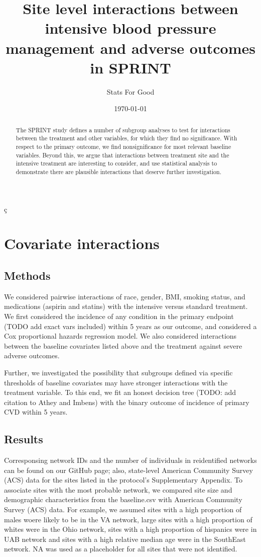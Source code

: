 ç\documentclass[10pt]{article}
\title{\vspace{-2em}Site level interactions between intensive blood pressure management and
  adverse outcomes in SPRINT}
\author{Stats For Good}
\date{\today}
\begin{document}
 \maketitle

\begin{abstract}
  The SPRINT study defines a number of subgroup analyses to test for
  interactions between the treatment and other variables, for which they find no
  significance. With respect to the primary outcome, we find nonsignificance
  for most relevant baseline variables. Beyond this, we argue that interactions
  between treatment site and the intensive treatment are interesting to
  consider, and use statistical analysis to demonstrate there are plausible
  interactions that deserve further investigation. 
\end{abstract}

\section{Covariate interactions}
\subsection{Methods}
We considered pairwise interactions of race, gender, BMI, smoking status, and
medications (aspirin and statins) with the intensive versus standard
treatment. We first considered the incidence of any condition in the
primary endpoint (TODO add exact vars included) within 5 years as our outcome,
and considered a Cox proportional hazards regression model. We also considered
interactions between the baseline covariates listed above and the treatment
against severe adverse outcomes.

Further, we investigated the possibility that subgroups defined via specific
thresholds of baseline covariates may have stronger interactions with the
treatment variable. To this end, we fit an honest decision tree (TODO: add
citation to Athey and Imbens) with the binary outcome of incidence of primary
CVD within 5 years.

\subsection{Results}
Corresponsing network IDs and the number of individuals in reidentified networks
can be found on our GitHub page; also, state-level American Community Survey (ACS)
data for the sites listed in the protocol's Supplementary Appendix. To associate
sites with the most probable network, we compared site size and demographic
characteristics from the baseline.csv with American Community Survey
(ACS) data.  For example, we assumed sites with a high proportion of males
woere likely to be in the VA network, large sites with a high proportion of whites
were in the Ohio network, sites with a high proportion of hispanics
were in UAB network and sites with a high relative median age were in the SouthEast
network.  NA was used as a placeholder for all sites that were not identified.
\end{document}
